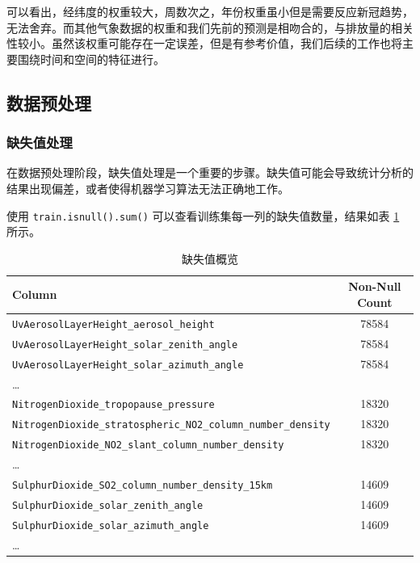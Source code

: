\documentclass{ctexart}
\begin{document}
\begin{sloppypar}
可以看出，经纬度的权重较大，周数次之，年份权重虽小但是需要反应新冠趋势，无法舍弃。而其他气象数据的权重和我们先前的预测是相吻合的，与排放量的相关性较小。虽然该权重可能存在一定误差，但是有参考价值，我们后续的工作也将主要围绕时间和空间的特征进行。

\subsection{数据预处理}

\subsubsection{缺失值处理}

在数据预处理阶段，缺失值处理是一个重要的步骤。缺失值可能会导致统计分析的结果出现偏差，或者使得机器学习算法无法正确地工作。

使用 \verb|train.isnull().sum()| 可以查看训练集每一列的缺失值数量，结果如表 \ref{tab:1} 所示。

\begin{table}[h]
      \centering
      \caption{缺失值概览}
      \label{tab:1}
      \begin{tabular}{lc}
            \hline
            Column                                                                & Non-Null Count \\ \hline
            \texttt{UvAerosolLayerHeight\_aerosol\_height}                        & 78584          \\
            \texttt{UvAerosolLayerHeight\_solar\_zenith\_angle}                   & 78584          \\
            \texttt{UvAerosolLayerHeight\_solar\_azimuth\_angle}                  & 78584          \\
            \ldots{}                                                              &                \\
            \texttt{NitrogenDioxide\_tropopause\_pressure}                        & 18320          \\
            \texttt{NitrogenDioxide\_stratospheric\_NO2\_column\_number\_density} & 18320          \\
            \texttt{NitrogenDioxide\_NO2\_slant\_column\_number\_density}         & 18320          \\
            \ldots{}                                                              &                \\
            \texttt{SulphurDioxide\_SO2\_column\_number\_density\_15km}           & 14609          \\
            \texttt{SulphurDioxide\_solar\_zenith\_angle}                         & 14609          \\
            \texttt{SulphurDioxide\_solar\_azimuth\_angle}                        & 14609          \\
            \ldots{}                                                              &                \\
            \hline
      \end{tabular}
\end{table}


\end{sloppypar}
\end{document}
